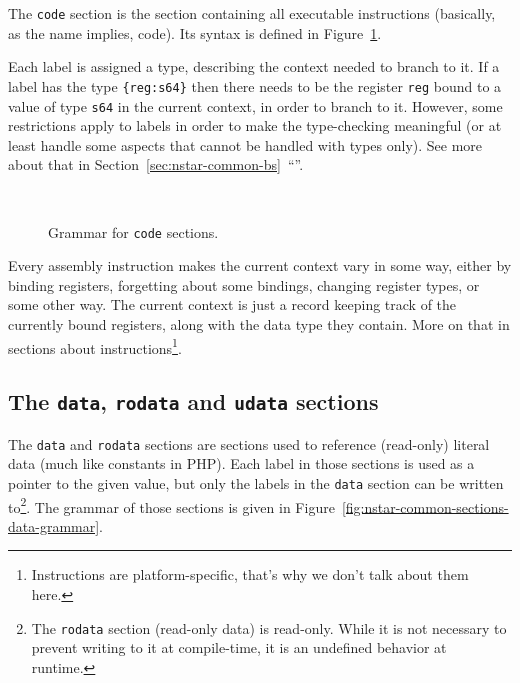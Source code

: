 The \texttt{code} section is the section containing all executable instructions (basically, as the name implies, code).
Its syntax is defined in Figure~\ref{fig:nstar-common-sections-code-grammar}.

Each label is assigned a type, describing the context needed to branch to it.
If a label has the type \texttt{\{reg:s64\}} then there needs to be the register \texttt{reg} bound to a value of type \texttt{s64} in the current context, in order to branch to it.
However, some restrictions apply to labels in order to make the type-checking meaningful (or at least handle some aspects that cannot be handled with types only). See more about that in Section~\ref{sec:nstar-common-bs}~``''.

\begin{figure}[htb]
  \centering
  \\

  \caption{Grammar for \texttt{code} sections.}
  \label{fig:nstar-common-sections-code-grammar}
\end{figure}

Every assembly instruction makes the current context vary in some way, either by binding registers, forgetting about some bindings, changing register types, or some other way. The current context is just a record keeping track of the currently bound registers, along with the data type they contain.
More on that in sections about instructions\footnote{Instructions are platform-specific, that's why we don't talk about them here.}.

\subsection{The \texttt{data}, \texttt{rodata} and \texttt{udata} sections}\label{subsec:nstar-common-sections-data}

The \texttt{data} and \texttt{rodata} sections are sections used to reference (read-only) literal data (much like constants in PHP).
Each label in those sections is used as a pointer to the given value, but only the labels in the \texttt{data} section can be written to\footnote{The \texttt{rodata} section (read-only data) is read-only. While it is not necessary to prevent writing to it at compile-time, it is an undefined behavior at runtime.}.
The grammar of those sections is given in Figure~\ref{fig:nstar-common-sections-data-grammar}.

